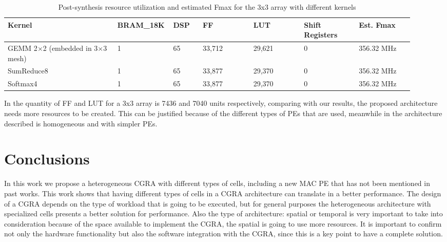 \documentclass[conference]{IEEEtran}
\begin{document}
\begin{table}[htbp]
\centering
\caption{Post-synthesis resource utilization and estimated Fmax for the 3x3 array with different kernels}
\label{tab:resource_util_3x3_kernels}
\scriptsize
\begin{adjustbox}{max width=\columnwidth}
\begin{tabular}{@{}p{0.26\linewidth}p{0.09\linewidth}p{0.07\linewidth}p{0.12\linewidth}p{0.12\linewidth}p{0.13\linewidth}p{0.13\linewidth}@{}}
\toprule
\textbf{Kernel} & \textbf{BRAM\_18K} & \textbf{DSP} & \textbf{FF} & \textbf{LUT} & \textbf{Shift Registers} & \textbf{Est. Fmax} \\
\midrule
GEMM 2$\times$2 (embedded in 3$\times$3 mesh) & 1 & 65 & 33,712 & 29,621 & 0 & 356.32 MHz \\
SumReduce8 & 1 & 65 & 33,877 & 29,370 & 0 & 356.32 MHz \\
Softmax4 & 1 & 65 & 33,877 & 29,370 & 0 & 356.32 MHz \\
\bottomrule
\end{tabular}
\end{adjustbox}
\end{table}

In \cite{leon} the quantity of FF and LUT for a 3x3 array is 7436 and 7040 units respectively, comparing with our results, the proposed architecture needs more resources to be created. 
This can be justified because of the different types of PEs that are used, meanwhile in \cite{leon} the architecture described is homogeneous and with simpler PEs.




\section{Conclusions}

In this work we propose a heterogeneous CGRA with different types of cells, including a new MAC PE that has not been mentioned in past works. 
This work shows that having different types of cells in a CGRA architecture can translate in a better performance. 
The design of a CGRA depends on the type of workload that is going to be executed, but for general purposes the heterogeneous architecture with specialized cells presents a better solution for performance.
Also the type of architecture: spatial or temporal is very important to take into consideration because of the space available to implement the CGRA, the spatial is going to use more resources. 
It is important to confirm not only the hardware functionality but also the software integration with the CGRA, since this is a key point to have a complete solution.
\end{document}
